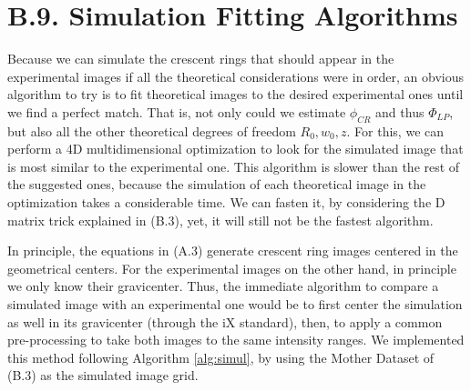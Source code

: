 \documentclass[11pt, a4paper, twoside]{article} %
\begin{document}
\section*{B.9. Simulation Fitting Algorithms}\vspace{-0.2cm}
Because we can simulate the crescent rings that should appear in the experimental images if all the theoretical considerations were in order, an obvious algorithm to try is to fit theoretical images to the desired experimental ones until we find a perfect match. That is, not only could we estimate $\phi_{CR}$ and thus $\Phi_{LP}$, but also all the other theoretical degrees of freedom $R_0,w_0,z$. For this, we can perform a 4D multidimensional optimization to look for the simulated image that is most similar to the experimental one. This algorithm is slower than the rest of the suggested ones, because the simulation of each theoretical image in the optimization takes a considerable time. We can fasten it, by considering the D matrix trick explained in (B.3), yet, it will still not be the fastest algorithm. 

In principle, the equations in (A.3) generate crescent ring images centered in the geometrical centers. For the experimental images on the other hand, in principle we only know their gravicenter. Thus, the immediate algorithm to compare a simulated image with an experimental one would be to first center the simulation as well in its gravicenter (through the iX standard), then, to apply a common pre-processing to take both images to the same intensity ranges. We implemented this method following Algorithm \ref{alg:simul}, by using the Mother Dataset of (B.3) as the simulated image grid.\vspace{-0.1cm}
\end{document}
